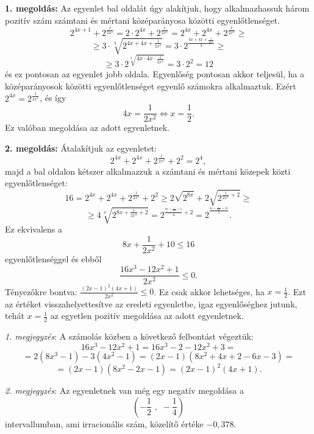 \documentclass[a4paper,10pt]{article}
\begin{document}
{\bf 1. megoldás: } Az egyenlet bal oldalát úgy alakítjuk, hogy
al\-kal\-maz\-has\-suk három po\-zi\-tív szám számtani és mértani
középarányo\-sa közötti egyenlőtlenséget.
\[{2^{4x + 1}} + {2^{\frac{1}{{2{x^2}}}}} = 2 \cdot {2^{4x}} +
{2^{\frac{1}{{2{x^2}}}}} = {2^{4x}} + {2^{4x}} + {2^{\frac{1}{{2{x^2}}}}}\geq\]
   \[\geq 3 \cdot \sqrt[3]{{{2^{4x + 4x + \frac{1}{{2{x^2}}}}}}} = 3
   \cdot {2^{\frac{{4x + 4x + \frac{1}{{2{x^2}}}}}{3}}}\geq\]
     \[\geq 3 \cdot {2^{\sqrt[3]{{4x \cdot 4x \cdot \frac{1}{{2{x^2}}}}}}} = 3
      \cdot {2^2} = 12\]  és ez  pontosan az egyenlet jobb oldala.
Egyenlőség pontosan akkor teljesül, ha a kö\-zép\-a\-rá\-nyosok
közötti egyenlőtlenséget egyenlő számokra alkalmaztuk.
Ezért ${2^{4x}} = {2^{\frac{1}{{2{x^2}}}}}$, és így
    \[4x = \frac{1}{{2{x^2}}} \Leftrightarrow x = \frac{1}{2}.\]
Ez valóban megoldása az adott egyenletnek.

\medskip

{\bf 2. megoldás: }  Átalakítjuk az egyenletet:
$${2^{4x}} + {2^{4x}} + {2^{\frac{1}{{2{x^2}}}}} + {2^2} = {2^4},$$
majd a bal oldalon kétszer alkalmazzuk a számtani és mértani
közepek közti egyenlőtlenséget:
$$16 = {2^{4x}} + {2^{4x}} +
{2^{\frac{1}{{2{x^2}}}}} + {2^2} \geqslant 2\sqrt {{2^{8x}}}  +
2\sqrt {{2^{\frac{1}{{2{x^2}}} + 2}}}  \geqslant$$ $$ \geqslant
4\sqrt[4]{{{2^{8x + \frac{1}{{2{x^2}}} + 2}}}} = {2^{\frac{{^{8x +
\frac{1}{{2{x^2}}} + 2}}}{4} + 2}} = {2^{^{\frac{8x +
\frac{1}{{2{x^2}}} + 10}{4}}}}.$$ Ez ekvivalens a $$8x +
\frac{1}{{2{x^2}}} + 10 \leqslant 16$$ egyenlőtlenséggel és
ebből $$\frac{{16{x^3} - 12{x^2} + 1}}{{2{x^2}}} \leqslant 0.$$
Tényezőkre bontva: $\frac{{{{\left( {2x - 1} \right)}^2}\left(
{4x + 1} \right)}}{{2{x^2}}} \leqslant 0$. Ez csak akkor lehetséges,
ha $x = \frac{1}{2}.$ Ezt az értéket visszahelyettesítve az
eredeti egyenletbe, igaz egyenlőséghez jutunk, tehát $x =
\frac{1}{2}$ az egyetlen pozitív megoldása az adott egyenletnek.

\medskip

\textit{1. megjegyzés}: A számolás közben a következő felbontást
vé\-gez\-tük:
  $$16{x^3} - 12{x^2} + 1 = 16{x^3} - 2 - 12{x^2} + 3 = $$
  $$=2\left( {8{x^3} - 1} \right) - 3\left( {4{x^2} - 1} \right)
  = \left( {2x - 1} \right)\left( {8{x^2} + 4x + 2 - 6x - 3} \right)
  =$$
 $$  = \left( {2x - 1} \right)\left( {8{x^2} - 2x - 1} \right) =
 {\left( {2x - 1} \right)^2}\left( {4x + 1}
 \right).$$

\medskip 

\textit{2. megjegyzés}:  Az egyenletnek van még egy negatív megoldása a
 \[\left( { - \frac{1}{2}\,\,,\,\, - \frac{1}{4}} \right)\]  intervallumban,
 ami irracionális szám, közelítő értéke $-0,378.$
\end{document}
